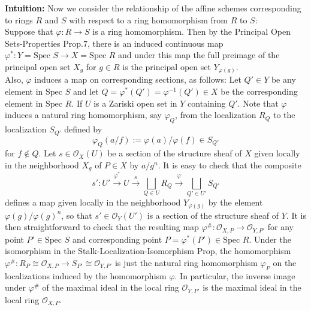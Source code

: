 \noindent\textbf{Intuition:} Now we consider the relationship of the affine schemes corresponding to rings $R$ and $S$ with respect to a ring homomorphism from $R$ to $S$:\\
Suppose that $\varphi:R \to S$ is a ring homomorphism. Then by the Principal Open Sets-Properties Prop.7, there is an induced continuous map $\varphi^*:Y= \text{Spec }S\to X=\text{Spec }R$ and under this map the full preimage of the principal open set $X_g$ for $g\in R$ is the principal open set $Y_{\varphi(g)}$.\\
Also, $\varphi$ induces a map on corresponding sections, as follows: Let $Q' \in Y$ be any element in $\text{Spec }S$ and let $Q= \varphi^*(Q')= \varphi^{-1} (Q') \in X$ be the corresponding element in $\text{Spec }R$. If $U$ is a Zariski open set in $Y$ containing $Q'$. Note that $\varphi$ induces a natural ring homomorphism, say $\varphi_Q$, from the localization $R_Q$ to the localization $S_{Q'}$ defined by
\[
\varphi_Q (a/f) := \varphi(a) /\varphi(f) \in S_{Q'}
\]
for $f\notin Q$. Let $s\in \mathcal{O}_X(U)$ be a section of the structure sheaf of $X$ given locally in the neighborhood $X_g$ of $P\in X$ by $a/g^n$. It is easy to check that the composite
\[
s': U' \overset{\varphi^*}{\longrightarrow} U \overset{s}{\longrightarrow} \bigsqcup_{Q \in U}R_Q \overset{\varphi}{\longrightarrow} \bigsqcup_{Q' \in U'} S_{Q'}
\]
defines a map given locally in the neighborhood $Y_{\varphi(g)}$ by the element $\varphi(g) /\varphi(g)^n$, so that $s'\in \mathcal{O}_Y (U')$ is a section of the structure sheaf of $Y$. It is then straightforward to check that the resulting map $\varphi^\# :\mathcal{O}_{X,P} \to \mathcal{O}_{Y,P'}$ for any point $P' \in \text{Spec }S$ and corresponding point $P= \varphi^* (P') \in \text{Spec }R$. Under the isomorphism in the Stalk-Localization-Isomorphism Prop, the homomorphism $\varphi^\#:R_P \cong \mathcal{O}_{X,P} \to S_{P'} \cong \mathcal{O}_{Y,P'}$ is just the natural ring homomorphism $\varphi_P$ on the localizations induced by the homomorphism $\varphi$. In particular, the inverse image under $\varphi^\#$ of the maximal ideal in the local ring $\mathcal{O}_{Y,P'}$ is the maximal ideal in the local ring $\mathcal{O}_{X,P}$.

